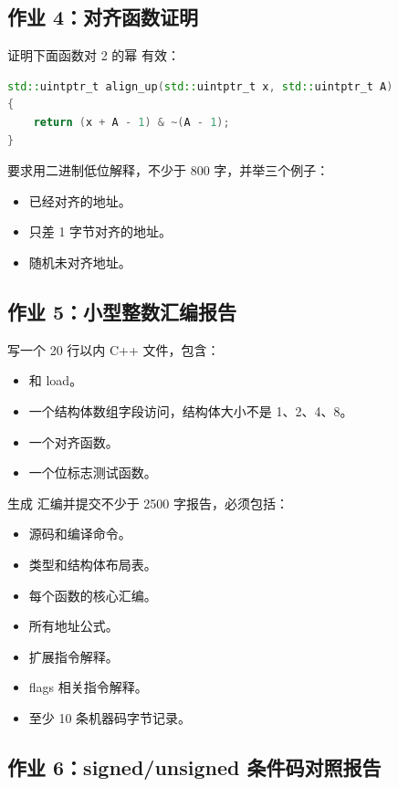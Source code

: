 \begin{exercisebox}
\subsection*{作业 4：对齐函数证明}

证明下面函数对 2 的幂  有效：

\begin{lstlisting}[language=C++]
std::uintptr_t align_up(std::uintptr_t x, std::uintptr_t A)
{
    return (x + A - 1) & ~(A - 1);
}
\end{lstlisting}

要求用二进制低位解释，不少于 800 字，并举三个例子：

\begin{itemize}
  \item 已经对齐的地址。
  \item 只差 1 字节对齐的地址。
  \item 随机未对齐地址。
\end{itemize}

\subsection*{作业 5：小型整数汇编报告}

写一个 20 行以内 C++ 文件，包含：

\begin{itemize}
  \item {} 和  load。
  \item 一个结构体数组字段访问，结构体大小不是 1、2、4、8。
  \item 一个对齐函数。
  \item 一个位标志测试函数。
\end{itemize}

生成  汇编并提交不少于 2500 字报告，必须包括：

\begin{itemize}
  \item 源码和编译命令。
  \item 类型和结构体布局表。
  \item 每个函数的核心汇编。
  \item 所有地址公式。
  \item 扩展指令解释。
  \item flags 相关指令解释。
  \item 至少 10 条机器码字节记录。
\end{itemize}

\subsection*{作业 6：signed/unsigned 条件码对照报告}


\end{exercisebox}

